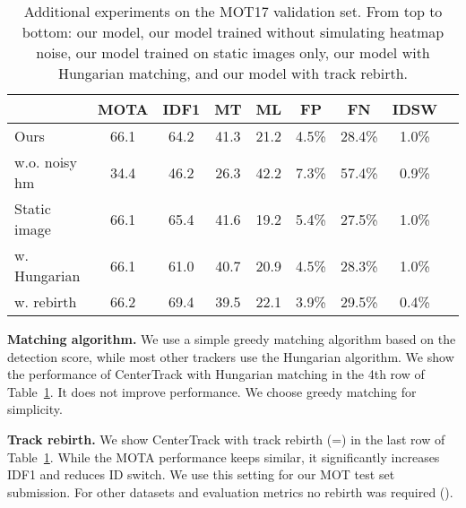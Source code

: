 \documentclass[runningheads]{llncs}
\newcommand{\lbltab}[1]{\label{tbl:#1}}
\newcommand{\reftab}[1]{Table~\ref{tbl:#1}}
\renewcommand{\paragraph}[1]{\noindent\textbf{#1}}
\begin{document}
\begin{table}[t]
\center 
\footnotesize
\begin{tabular}{@{}l@{}c@{\ } c@{\ } c@{\ } c@{\ } c@{\ } c@{\ } c@{\ } c@{}}
\toprule
 & MOTA  & IDF1  & MT  & ML  & FP  & FN  & IDSW  \\
\midrule
Ours & 66.1 & 64.2 & 41.3 & 21.2 & 4.5\% & 28.4\% & 1.0\% \\
w.o. noisy hm & 34.4 & 46.2 & 26.3 & 42.2 & 7.3\% & 57.4\% & 0.9\% \\
Static image & 66.1 & 65.4 & 41.6 & 19.2 & 5.4\% & 27.5\% & 1.0\% \\
w. Hungarian & 66.1 & 61.0 & 40.7 & 20.9 & 4.5\% & 28.3\% & 1.0\% \\
w. rebirth & 66.2 & 69.4 & 39.5 & 22.1 & 3.9\% & 29.5\% & 0.4\% \\
\bottomrule
\end{tabular}
\caption{Additional experiments on the MOT17 validation set. From top to bottom: our model, our model trained without simulating heatmap noise, our model trained on static images only, our model with Hungarian matching, and our model with track rebirth.}
\lbltab{additional:mot}
\vspace{-7mm}
\end{table}

\paragraph{Matching algorithm.} We use a simple greedy matching algorithm based on the detection score, while most other trackers use the Hungarian algorithm. We show the performance of CenterTrack with Hungarian matching in the 4th row of \reftab{additional:mot}. It does not improve performance. We choose greedy matching for simplicity.

\paragraph{Track rebirth.} 
We show CenterTrack with track rebirth (=) in the last row of \reftab{additional:mot}. While the MOTA performance keeps similar, it significantly increases IDF1 and reduces ID switch. We use this setting for our MOT test set submission.
For other datasets and evaluation metrics no rebirth was required ().
\end{document}
